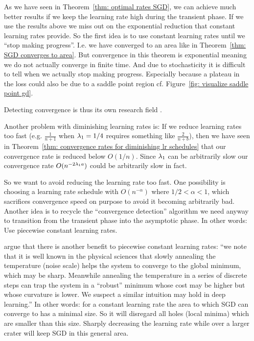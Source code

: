As we have seen in Theorem~\ref{thm: optimal rates SGD}, we can achieve
much better results if we keep the learning rate high during the transient
phase. If we use the results above we miss out on the exponential reduction that
constant learning rates provide. So the first idea is to use constant learning
rates until we ``stop making progress''. I.e. we have converged to an area like
in Theorem~\ref{thm: SGD converges to area}. But convergence in this theorem is
exponential meaning we do not actually converge in finite time. And due to
stochasticity it is difficult to tell when we actually stop making progress.
Especially because a plateau in the loss could also be due to a saddle point
region cf. Figure~\ref{fig: visualize saddle point gd}.

Detecting convergence is thus its own research field \parencite[for a recent
approach including an overview of previous work see
e.g.][]{pesmeConvergenceDiagnosticBasedStep2020}.

Another problem with diminishing learning rates is: If we reduce learning rates
too fast (e.g. \(\tfrac{1}{n+1}\) when \(\lambda_1=1/4\) requires something
like \(\tfrac{2}{n+b}\)), then we have seen in Theorem~\ref{thm: convergence
rates for diminishing lr schedules} that our convergence rate is reduced below
\(O(1/n)\). Since \(\lambda_1\) can be arbitrarily slow our convergence rate
\(O(n^{-2\lambda_1 a})\) could be arbitrarily slow in fact.

So we want to avoid reducing the learning rate too fast. One possibility is
choosing a learning rate schedule with \(O(n^{-\alpha})\) where \(1/2<\alpha<1\),
which sacrifices convergence speed on purpose to avoid it becoming arbitrarily
bad. Another idea is to recycle the ``convergence detection'' algorithm we
need anyway to transition from the transient phase into the asymptotic phase.
In other words: Use piecewise constant learning rates.

\textcite{smithDonDecayLearning2018} argue that there is another benefit to
piecewise constant learning rates: ``we note that it is well known in the
physical sciences that slowly annealing the temperature (noise scale) helps the
system to converge to the global minimum, which may be sharp. Meanwhile
annealing the temperature in a series of discrete steps can trap the system in a
“robust” minimum whose cost may be higher but whose curvature is lower. We
suspect a similar intuition may hold in deep learning.''
In other words: for a constant learning rate the area to which SGD can converge
to has a minimal size. So it will disregard all holes (local minima) which are
smaller than this size. Sharply decreasing the learning rate while over a larger
crater will keep SGD in this general area.

